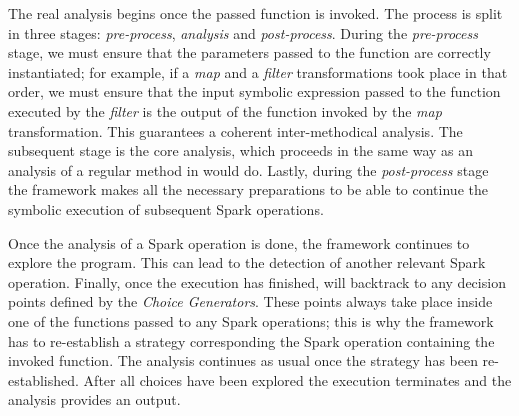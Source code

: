 The real analysis begins once the passed function is invoked. The process is split in three stages: \textit{pre-process}, \textit{analysis} and \textit{post-process}. During the \textit{pre-process} stage, we must ensure that the parameters passed to the function are correctly instantiated; for example, if a \textit{map} and a \textit{filter} transformations took place in that order, we must ensure that the input symbolic expression passed to the function executed by the \textit{filter} is the output of the function invoked by the \textit{map} transformation. This guarantees a coherent inter-methodical analysis. The subsequent stage is the core analysis, which proceeds in the same way as an analysis of a regular method in \spf{} would do. Lastly, during the \textit{post-process} stage the framework makes all the necessary preparations to be able to continue the symbolic execution of subsequent Spark operations.

Once the analysis of a Spark operation is done, the framework continues to explore the program. This can lead to the detection of another relevant Spark operation. Finally, once the execution has finished, \jpf{} will backtrack to any decision points defined by the \textit{Choice Generators}. These points always take place inside one of the functions passed to any Spark operations; this is why the framework has to re-establish a strategy corresponding the Spark operation containing the invoked function. The analysis continues as usual once the strategy has been re-established. After all choices have been explored the execution terminates and the analysis provides an output.

